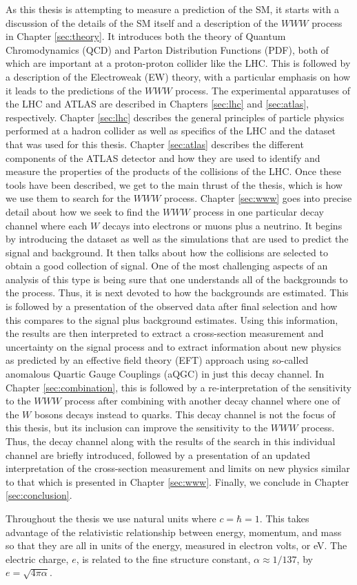 As this thesis is attempting to measure a prediction of the SM, it starts
with a discussion of the details of the SM itself and a description of the 
$WWW$ process in Chapter \ref{sec:theory}. It introduces both the theory 
of Quantum Chromodynamics (QCD) and Parton Distribution Functions (PDF), both
of which are important at a proton-proton collider like the LHC.  
This is followed by 
a description of the Electroweak (EW) theory, with a particular emphasis
on how it leads to the predictions of the $WWW$ process. The experimental
apparatuses of the LHC and ATLAS are described in Chapters \ref{sec:lhc} and
\ref{sec:atlas}, respectively. Chapter \ref{sec:lhc}
describes the general principles of particle physics performed at a hadron collider
as well as specifics of the LHC and the dataset that was used for this thesis. 
Chapter \ref{sec:atlas} describes the different components of the ATLAS detector
and how they are used to identify and measure the properties of the products
of the collisions of the LHC.  Once these tools have been described, 
we get to the main thrust of the thesis, which is how we use them to search for the 
$WWW$ process.  Chapter \ref{sec:www} goes into precise detail about how
we seek to find the $WWW$ process in one particular decay channel where 
each $W$ decays into electrons or muons plus a neutrino. It begins
by introducing the 
dataset as well as  the simulations that are used to predict the 
signal and background.
It then talks about how the collisions are selected to obtain a good 
collection of signal.
One of the most challenging aspects of an analysis of this type is 
being sure
that one understands all of the backgrounds to the process. Thus, it is 
next devoted
to how the backgrounds are estimated. This is followed by a presentation of 
the observed
data after final selection and how this compares to the signal plus 
background estimates. 
Using this information, the results are then interpreted to extract a cross-section
measurement and uncertainty on the signal process and to extract information about
new physics as predicted by an effective field theory (EFT) approach using so-called 
anomalous Quartic Gauge Couplings (aQGC) in just this decay channel. In Chapter
\ref{sec:combination}, this is 
followed by a re-interpretation of the sensitivity to the $WWW$ process
after combining with another decay channel where one of the $W$ 
bosons  decays instead
to quarks. This decay channel is not the focus of this thesis, but its 
inclusion can
improve the sensitivity to the $WWW$ process. Thus, the decay channel along with
the results of the search in this individual channel are briefly 
introduced, followed
by a presentation of an updated interpretation of the cross-section 
measurement and 
limits on new physics similar to that which is presented 
in Chapter \ref{sec:www}.
Finally, we conclude in Chapter \ref{sec:conclusion}.

Throughout the thesis we use natural units where $c = \hbar = 1$. 
This takes advantage
of the relativistic relationship between energy, momentum, and mass so that they 
are all in units of the energy, measured in electron volts, or eV. 
The electric charge, $e$, is related
to the fine structure 
constant, $\alpha \approx 1/137$, by $e = \sqrt{4 \pi \alpha}$.


